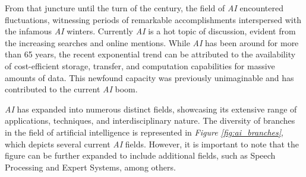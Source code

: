 From that juncture until the turn of the century, the field of \textit{AI}
encountered fluctuations, witnessing periods of remarkable accomplishments
interspersed with the infamous \textit{AI} winters. Currently \textit{AI} is a
hot topic of discussion, evident from the increasing searches and online
mentions. While \textit{AI} has been around for more than 65 years, the recent
exponential trend can be attributed to the availability of cost-efficient
storage, transfer, and computation capabilities for massive amounts of data.
This newfound capacity was previously unimaginable and has contributed to the
current \textit{AI} boom. \newline

\textit{AI} has expanded into numerous distinct fields, showcasing its
extensive range of applications, techniques, and interdisciplinary nature. The
diversity of branches in the field of artificial intelligence is represented in
\textit{Figure \ref{fig:ai_branches}}, which depicts several current
\textit{AI} fields. However, it is important to note that the figure can be
further expanded to include additional fields, such as Speech Processing and
Expert Systems, among others.

